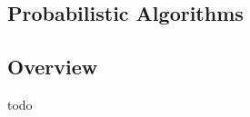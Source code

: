 

\renewcommand{\bibsection}{\subsection{\bibname}}
\begin{bibunit}

\chapter{Probabilistic Algorithms}
\label{ch:probabilistic}

\section{Overview}
todo


\putbib
\end{bibunit}

\newpage\begin{bibunit}\putbib\end{bibunit}
\newpage\begin{bibunit}\putbib\end{bibunit}
\newpage\begin{bibunit}\putbib\end{bibunit}
\newpage\begin{bibunit}\putbib\end{bibunit}
\newpage\begin{bibunit}\putbib\end{bibunit}
